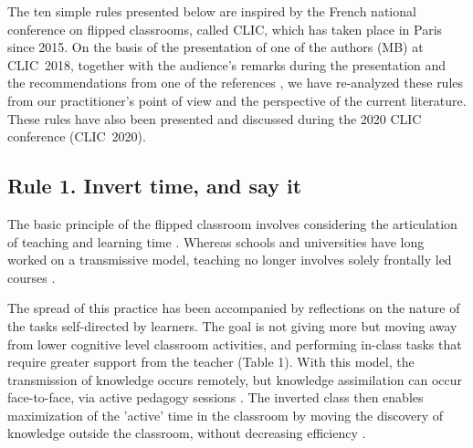 \documentclass[10pt,letterpaper]{article}
\begin{document}
The ten simple rules presented below are inspired by the French national conference on flipped classrooms, called CLIC, which has taken place 
in Paris since 2015. On the basis of the presentation of one of the authors (MB) at CLIC~2018, together with the audience’s remarks 
during the presentation and the recommendations from one of the references \cite{lo_critical_2017}, we have re-analyzed these rules from our practitioner's point of view and the perspective of the current literature.
These rules have also been presented and discussed during the 2020 CLIC conference (CLIC~2020).


\subsection{Rule 1. Invert time, and say it }

The basic principle of the flipped classroom involves considering the articulation of teaching and learning time \cite{bergmann_flip_2012,schell_flipping_2015}. Whereas schools and universities have long worked on a transmissive model, 
teaching no longer involves solely frontally led courses \cite{crouch_peer_2001}.

The spread of this practice has been accompanied by reflections on the nature of the tasks self-directed by learners. 
The goal is not giving more \cite{lo_critical_2017} but moving away from lower cognitive level classroom activities, 
and performing in-class tasks that require greater support from the teacher \cite{lebrun_vers_2016,anderson_taxonomy_2001,bloom_taxonomy_1956,sarawagi_flipped_2014} (Table 1). 
With this model, the transmission of knowledge occurs remotely, but knowledge assimilation can occur face-to-face, 
via active pedagogy sessions \cite{freeman_reply_2014}. 
The inverted class then enables maximization of the 'active' time in the classroom 
by moving the discovery of knowledge outside the classroom, without decreasing efficiency \cite{delozier_flipped_2017}.
\end{document}

